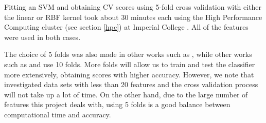 \documentclass[12pt, twoside, a4paper]{report}
\begin{document}
Fitting an SVM and obtaining CV scores using 5-fold cross validation with either the linear or RBF kernel took about 30 minutes each using the High Performance Computing cluster (see section \ref{hpc}) at Imperial College \cite{RefWorks:218}. All of the features were used in both cases.

The choice of 5 folds was also made in other works such as \cite{RefWorks:187}, while other works such as \cite{RefWorks:202} and \cite{RefWorks:212} use 10 folds. More folds will allow us to train and test the classifier more extensively, obtaining scores with higher accuracy. However, we note that \cite{RefWorks:202} investigated data sets with less than 20 features and the cross validation process will not take up a lot of time. On the other hand, due to the large number of features this project deals with, using 5 folds is a good balance between computational time and accuracy.
\end{document}
